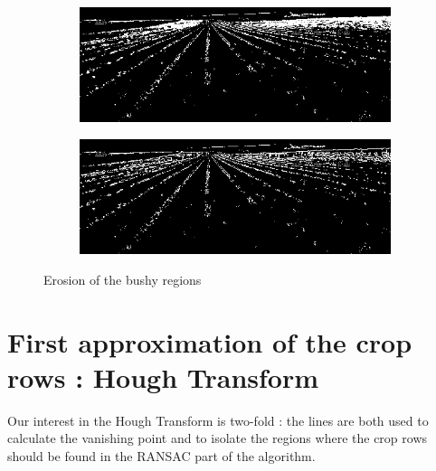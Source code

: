 \begin{figure}[H]
\centering
\begin{subfigure}{0.49\textwidth}
    \includegraphics[width=\textwidth]{Report/images/IMGALLBUSHES.png}
    \label{fig:first}
\end{subfigure}
\begin{subfigure}{0.49\textwidth}%
    \includegraphics[width=\textwidth]{Report/images/IMGNOBUSHES.png}
    \label{fig:second}
\end{subfigure}
\caption{Erosion of the bushy regions}
\end{figure}
\label{pics: bushyremoval}

\section{First approximation of the crop rows : Hough Transform}
\label{sec:gliederung}

Our interest in the Hough Transform is two-fold : the lines are both used to calculate the vanishing point and to isolate the regions where the crop rows should be found in the RANSAC part of the algorithm. \\

